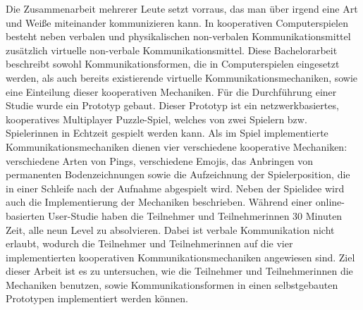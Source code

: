 Die Zusammenarbeit mehrerer Leute setzt vorraus, das man über irgend eine Art und Weiße miteinander kommunizieren kann. In kooperativen Computerspielen  besteht neben verbalen und physikalischen non-verbalen Kommunikationsmittel zusätzlich virtuelle non-verbale Kommunikationsmittel.
Diese Bachelorarbeit beschreibt sowohl Kommunikationsformen, die in Computerspielen eingesetzt werden, als auch bereits existierende virtuelle Kommunikationsmechaniken, sowie eine Einteilung dieser kooperativen Mechaniken. 
Für die Durchführung einer Studie wurde ein Prototyp gebaut. Dieser Prototyp ist ein netzwerkbasiertes, kooperatives Multiplayer Puzzle-Spiel, welches von zwei Spielern bzw. Spielerinnen in Echtzeit gespielt werden kann. Als im Spiel implementierte Kommunikationsmechaniken dienen vier verschiedene kooperative Mechaniken: verschiedene Arten von Pings, verschiedene Emojis, das Anbringen von permanenten Bodenzeichnungen sowie die Aufzeichnung der Spielerposition, die in einer Schleife nach der Aufnahme abgespielt wird. 
Neben der Spielidee wird auch die Implementierung der Mechaniken beschrieben.
Während einer online-basierten User-Studie haben die Teilnehmer und Teilnehmerinnen 30 Minuten Zeit, alle neun Level zu absolvieren. Dabei ist verbale Kommunikation nicht erlaubt, wodurch die Teilnehmer und Teilnehmerinnen auf die vier implementierten kooperativen Kommunikationsmechaniken angewiesen sind. Ziel dieser Arbeit ist es zu untersuchen, wie die Teilnehmer und Teilnehmerinnen die Mechaniken benutzen, sowie Kommunikationsformen in einen selbstgebauten Prototypen implementiert werden können.